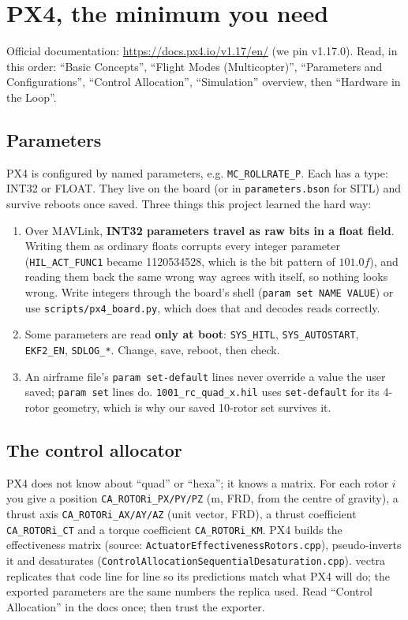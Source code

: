 \documentclass[11pt,a4paper]{article}
\newcommand{\file}[1]{\texttt{#1}}
\newcommand{\param}[1]{\texttt{#1}}
\begin{document}
\section{PX4, the minimum you need}

Official documentation: \url{https://docs.px4.io/v1.17/en/} (we pin v1.17.0). Read, in this
order: ``Basic Concepts'', ``Flight Modes (Multicopter)'', ``Parameters and Configurations'',
``Control Allocation'', ``Simulation'' overview, then ``Hardware in the Loop''.

\subsection{Parameters}
PX4 is configured by named parameters, e.g. \param{MC\_ROLLRATE\_P}. Each has a type: INT32 or
FLOAT. They live on the board (or in \file{parameters.bson} for SITL) and survive reboots once
saved. Three things this project learned the hard way:
\begin{enumerate}
  \item Over MAVLink, \textbf{INT32 parameters travel as raw bits in a float field}. Writing them
        as ordinary floats corrupts every integer parameter (\param{HIL\_ACT\_FUNC1} became
        1120534528, which is the bit pattern of $101.0f$), and reading them back the same wrong
        way agrees with itself, so nothing looks wrong. Write integers through the board's shell
        (\file{param set NAME VALUE}) or use \file{scripts/px4\_board.py}, which does that and
        decodes reads correctly.
  \item Some parameters are read \textbf{only at boot}: \param{SYS\_HITL}, \param{SYS\_AUTOSTART},
        \param{EKF2\_EN}, \param{SDLOG\_*}. Change, save, reboot, then check.
  \item An airframe file's \file{param set-default} lines never override a value the user saved;
        \file{param set} lines do. \file{1001\_rc\_quad\_x.hil} uses \file{set-default} for its
        4-rotor geometry, which is why our saved 10-rotor set survives it.
\end{enumerate}

\subsection{The control allocator}
PX4 does not know about ``quad'' or ``hexa''; it knows a matrix. For each rotor $i$ you give a
position \param{CA\_ROTORi\_PX/PY/PZ} (m, FRD, from the centre of gravity), a thrust axis
\param{CA\_ROTORi\_AX/AY/AZ} (unit vector, FRD), a thrust coefficient \param{CA\_ROTORi\_CT} and
a torque coefficient \param{CA\_ROTORi\_KM}. PX4 builds the effectiveness matrix (source:
\file{ActuatorEffectivenessRotors.cpp}), pseudo-inverts it and desaturates
(\file{ControlAllocationSequentialDesaturation.cpp}). vectra replicates that code line for line
so its predictions match what PX4 will do; the exported parameters are the same numbers the
replica used. Read ``Control Allocation'' in the docs once; then trust the exporter.
\end{document}
